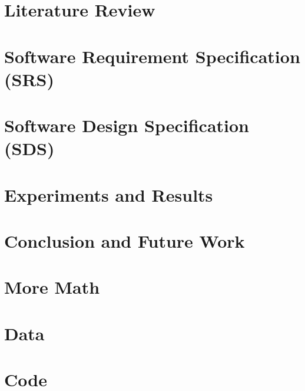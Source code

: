 \documentclass[12pt,twosided]{report}
\begin{document}
\chapter{Literature Review}
\label{chap:lit}


\chapter{Software Requirement
Specification (SRS)}
\label{chap:srs}


\chapter{Software Design 
Specification (SDS)}
\label{chap:sds}


\chapter{Experiments and Results}
\label{chap:results}


\chapter{Conclusion and Future Work}
\label{chap:outro}


\begin{appendices}


  
\chapter{More Math}


\chapter{Data}


\chapter{Code}

\end{appendices}

\printbibliography[heading=bibintoc,title={References}]
\end{document}
